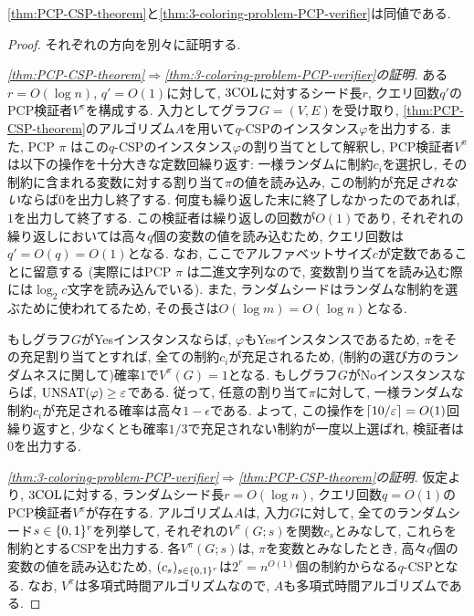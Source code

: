 \begin{lemma}{}{}
  \cref{thm:PCP-CSP-theorem}と\cref{thm:3-coloring-problem-PCP-verifier}は同値である.
\end{lemma}
\begin{proof}
  それぞれの方向を別々に証明する.

  \emph{\cref{thm:PCP-CSP-theorem}$\Rightarrow$\cref{thm:3-coloring-problem-PCP-verifier}の証明.}
  ある$r=O(\log n)$, $q'=O(1)$に対して, $\text{3COL}$に対するシード長$r$, クエリ回数$q'$のPCP検証者$V^\pi$を構成する.
  入力としてグラフ$G=(V,E)$を受け取り, \cref{thm:PCP-CSP-theorem}のアルゴリズム$A$を用いて$q$-CSPのインスタンス$\varphi$を出力する.
  また, PCP $\pi$ はこの$q$-CSPのインスタンス$\varphi$の割り当てとして解釈し,
  PCP検証者$V^\pi$は以下の操作を十分大きな定数回繰り返す: 一様ランダムに制約$c_i$を選択し, その制約に含まれる変数に対する割り当て$\pi$の値を読み込み, この制約が充足\emph{されない}ならば$0$を出力し終了する. 何度も繰り返した末に終了しなかったのであれば, $1$を出力して終了する.
  この検証者は繰り返しの回数が$O(1)$であり, それぞれの繰り返しにおいては高々$q$個の変数の値を読み込むため, クエリ回数は$q'=O(q)=O(1)$となる. なお, ここでアルファベットサイズ$c$が定数であることに留意する (実際にはPCP $\pi$ は二進文字列なので, 変数割り当てを読み込む際には$\log_2 c$文字を読み込んでいる).
  また, ランダムシードはランダムな制約を選ぶために使われてるため, その長さは$O(\log m)=O(\log n)$となる.

  もしグラフ$G$がYesインスタンスならば, $\varphi$もYesインスタンスであるため, $\pi$をその充足割り当てとすれば, 全ての制約$c_i$が充足されるため, (制約の選び方のランダムネスに関して)確率$1$で$V^\pi(G)=1$となる.
  もしグラフ$G$がNoインスタンスならば, $\mathrm{UNSAT}(\varphi) \ge \varepsilon$である. 従って, 任意の割り当て$\pi$に対して, 一様ランダムな制約$c_i$が充足される確率は高々$1-\epsilon$である.
  よって, この操作を$\lceil10/\varepsilon\rceil=O(1)$回繰り返すと, 少なくとも確率$1/3$で充足されない制約が一度以上選ばれ, 検証者は$0$を出力する.


  \emph{\cref{thm:3-coloring-problem-PCP-verifier}$\Rightarrow$\cref{thm:PCP-CSP-theorem}の証明.}
  仮定より, $\text{3COL}$に対する, ランダムシード長$r=O(\log n)$, クエリ回数$q=O(1)$のPCP検証者$V^\pi$が存在する. アルゴリズム$A$は, 入力$G$に対して, 全てのランダムシード$s\in \{0,1\}^r$を列挙して, それぞれの$V^\pi(G;s)$を関数$c_s$とみなして, これらを制約とするCSPを出力する. 各$V^\pi(G;s)$は, $\pi$を変数とみなしたとき, 高々$q$個の変数の値を読み込むため, $(c_s)_{s\in\{0,1\}^r}$は$2^r=n^{O(1)}$個の制約からなる$q$-CSPとなる.
  なお, $V^\pi$は多項式時間アルゴリズムなので, $A$も多項式時間アルゴリズムである.
\end{proof}

